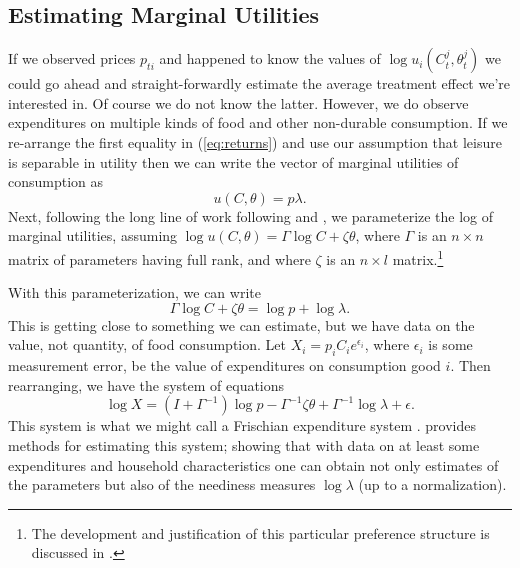 \documentclass[11pt]{article}
\newcommand{\Eq}[1]{(\ref{eq:#1})}
\begin{document}
\subsection*{Estimating Marginal Utilities}
\label{sec-5-1}

If we observed prices $p_{ti}$ and happened to know the values of
$\log u_i(C^j_t,\theta^j_t)$ we could go ahead and straight-forwardly
estimate the average treatment effect we're interested in.  Of course
we do not know the latter.  However, we do observe expenditures on
multiple kinds of food and other non-durable consumption.  If we
re-arrange the first equality in \Eq{returns} and use our assumption
that leisure is separable in utility then we can write the vector of
marginal utilities of consumption as \[ u(C,\theta)=p\lambda.  \]
Next, following the long line of work following
\cite{Heckman-Macurdy80} and \cite{Macurdy83}, we parameterize the log
of marginal utilities, assuming $\log u(C,\theta)=\Gamma\log C +
\zeta\theta$, where $\Gamma$ is an $n\times n$ matrix of parameters
having full rank, and where $\zeta$ is an $n\times l$ matrix.\footnote{The
development and justification of this particular preference structure
is discussed in \cite{ligon15}.}

With this parameterization, we can write \[ \Gamma\log C + \zeta\theta
= \log p + \log\lambda.  \] This is getting close to something we can
estimate, but we have data on the value, not quantity, of food
consumption.  Let $X_i=p_iC_ie^{\epsilon_i}$, where $\epsilon_i$ is
some measurement error, be the value of expenditures on consumption
good $i$.  Then rearranging, we have the system of equations
\begin{equation}
\label{eq:expenditures}
\log X  = (I + \Gamma^{-1})\log p - \Gamma^{-1}\zeta\theta + \Gamma^{-1}\log\lambda
+ \epsilon.
\end{equation}
This system is what we might call a Frischian expenditure system
\citep{browning-etal85}.  \cite{ligon16a} provides methods for
estimating this system; showing that with data on at least some
expenditures and household characteristics one can obtain not only
estimates of the parameters but also of the neediness measures
$\log\lambda$ (up to a normalization).
\end{document}
